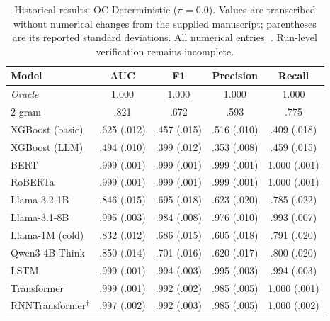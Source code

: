 \begin{table}[H]
\centering\small
\caption{Historical results: OC-Deterministic ($\pi=0.0$). Values are transcribed without numerical changes from the supplied manuscript; parentheses are its reported standard deviations. All numerical entries: \ou. Run-level verification remains incomplete.}
\begin{tabular}{@{}lcccc@{}}\toprule
Model & AUC & F1 & Precision & Recall \\\midrule
\textit{Oracle} & 1.000 & 1.000 & 1.000 & 1.000 \\
2-gram & .821 & .672 & .593 & .775 \\
XGBoost (basic) & .625 (.012) & .457 (.015) & .516 (.010) & .409 (.018) \\
XGBoost (LLM) & .494 (.010) & .399 (.012) & .353 (.008) & .459 (.015) \\
BERT & .999 (.001) & .999 (.001) & .999 (.001) & 1.000 (.001) \\
RoBERTa & .999 (.001) & .999 (.001) & .999 (.001) & 1.000 (.001) \\
Llama-3.2-1B & .846 (.015) & .695 (.018) & .623 (.020) & .785 (.022) \\
Llama-3.1-8B & .995 (.003) & .984 (.008) & .976 (.010) & .993 (.007) \\
Llama-1M (cold) & .832 (.012) & .686 (.015) & .605 (.018) & .791 (.020) \\
Qwen3-4B-Think & .850 (.014) & .701 (.016) & .620 (.017) & .800 (.020) \\
LSTM & .999 (.001) & .994 (.003) & .995 (.003) & .994 (.003) \\
Transformer & .999 (.001) & .992 (.002) & .985 (.005) & 1.000 (.001) \\
RNNTransformer$^{\dagger}$ & .997 (.002) & .992 (.003) & .985 (.005) & 1.000 (.002) \\
\bottomrule\end{tabular}
\end{table}
